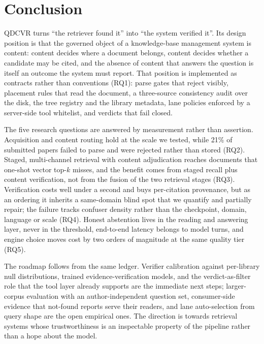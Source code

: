 \section{Conclusion}
\label{sec:conclusion}

QDCVR turns ``the retriever found it'' into ``the system verified it''. Its
design position is that the governed object of a knowledge-base management
system is content: content decides where a document belongs, content decides
whether a candidate may be cited, and the absence of content that answers the
question is itself an outcome the system must report. That position is
implemented as contracts rather than conventions (RQ1): parse gates that
reject visibly, placement rules that read the document, a three-source
consistency audit over the disk, the tree registry and the library metadata,
lane policies enforced by a server-side tool whitelist, and verdicts that fail
closed.

The five research questions are answered by measurement rather than
assertion. Acquisition and content routing hold at the scale we tested, while
21\% of submitted papers failed to parse and were rejected rather than stored
(RQ2). Staged, multi-channel retrieval with content adjudication reaches
documents that one-shot vector top-$k$ misses, and the benefit comes from
staged recall plus content verification, not from the fusion of the two
retrieval stages (RQ3). Verification costs well under a second and buys
per-citation provenance, but as an ordering it inherits a same-domain blind
spot that we quantify and partially repair; the failure tracks confuser
density rather than the checkpoint, domain, language or scale (RQ4). Honest
abstention lives in the reading and answering layer, never in the threshold,
end-to-end latency belongs to model turns, and engine choice moves cost by two
orders of magnitude at the same quality tier (RQ5).

The roadmap follows from the same ledger. Verifier calibration against
per-library null distributions, trained evidence-verification models, and the
verdict-as-filter role that the tool layer already supports are the immediate
next steps; larger-corpus evaluation with an author-independent question set,
consumer-side evidence that not-found reports serve their readers, and lane
auto-selection from query shape are the open empirical ones. The direction is
towards retrieval systems whose trustworthiness is an inspectable property of
the pipeline rather than a hope about the model.
